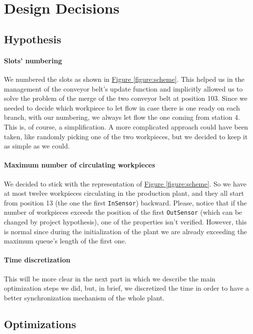 \documentclass[a4paper]{article}
\newcommand{\figureref}[1]{\textsf{\hyperref[#1]{Figure \ref*{#1}}}}
\begin{document}
    \section{Design Decisions} \label{section:design_decisions}

    \subsection{Hypothesis}

    \paragraph{Slots' numbering} We numbered the slots as shown in \figureref{figure:scheme}. This helped us in the management of the conveyor belt's update function and implicitly allowed us to solve the problem of the merge of the two conveyor belt at position 103. Since we needed to decide which workpiece to let flow in case there is one ready on each branch, with our numbering, we always let flow the one coming from station 4. This is, of course, a simplification. A more complicated approach could have been taken, like randomly picking one of the two workpieces, but we decided to keep it as simple as we could.

    \paragraph{Maximum number of circulating workpieces} We decided to stick with the representation of \figureref{figure:scheme}. So we have at most twelve workpieces circulating in the production plant, and they all start from position 13 (the one the first \texttt{InSensor}) backward. Please, notice that if the number of workpieces exceeds the position of the first \texttt{OutSensor} (which can be changed by project hypothesis), one of the properties isn't verified. However, this is normal since during the initialization of the plant we are already exceeding the maximum queue's length of the first one.

    \paragraph{Time discretization} This will be more clear in the next part in which we describe the main optimization steps we did, but, in brief, we discretized the time in order to have a better synchronization mechanism of the whole plant.

    \subsection{Optimizations}
\end{document}
